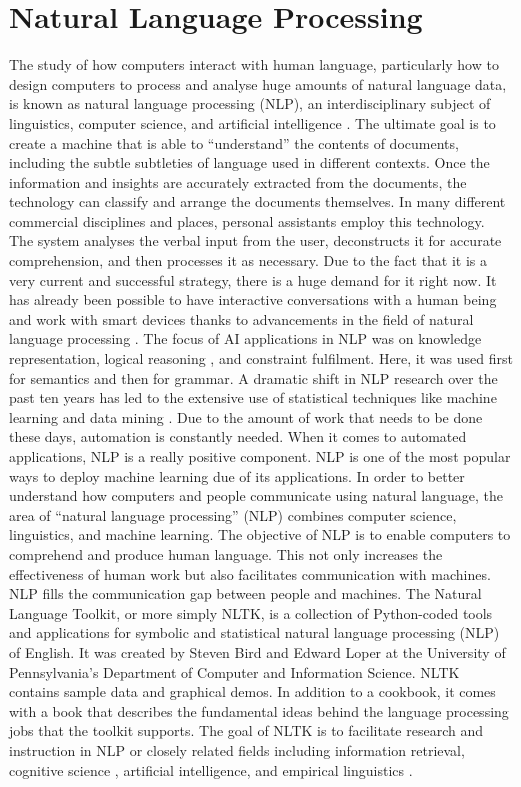 \documentclass[sn-basic]{sn-jnl}%
\theoremstyle{thmstyleone}%
\theoremstyle{thmstyletwo}%
\theoremstyle{thmstylethree}%
\begin{document}
\section{Natural Language Processing}
The study of how computers interact with human language, particularly how to design computers to process and analyse huge amounts of natural language data, is known as natural language processing (NLP), an interdisciplinary subject of linguistics, computer science, and artificial intelligence \cite{olsson2022estimating}. The ultimate goal is to create a machine that is able to “understand” the contents of documents, including the subtle subtleties of language used in different contexts. Once the information and insights are accurately extracted from the documents, the technology can classify and arrange the documents themselves. In many different commercial disciplines and places, personal assistants employ this technology. The system analyses the verbal input from the user, deconstructs it for accurate comprehension, and then processes it as necessary. Due to the fact that it is a very current and successful strategy, there is a huge demand for it right now. It has already been possible to have interactive conversations with a human being and work with smart devices thanks to advancements in the field of natural language processing \cite{wahab2021dna}. The focus of AI applications in NLP was on knowledge representation, logical reasoning \cite{houde2003neural}, and constraint fulfilment. Here, it was used first for semantics and then for grammar. A dramatic shift in NLP research over the past ten years has led to the extensive use of statistical techniques like machine learning \cite{ward2022machine} and data mining \cite{martinez2022nationwide}. Due to the amount of work that needs to be done these days, automation is constantly needed. When it comes to automated applications, NLP is a really positive component. NLP is one of the most popular ways to deploy machine learning due of its applications. In order to better understand how computers and people communicate using natural language, the area of “natural language processing” (NLP) combines computer science, linguistics, and machine learning. The objective of NLP is to enable computers to comprehend and produce human language. This not only increases the effectiveness of human work but also facilitates communication with machines. NLP fills the communication gap between people and machines. The Natural Language Toolkit, or more simply NLTK, is a collection of Python-coded tools and applications for symbolic and statistical natural language processing (NLP) of English. It was created by Steven Bird and Edward Loper at the University of Pennsylvania's Department of Computer and Information \cite{roth2022natural} Science. NLTK contains sample data and graphical demos. In addition to a cookbook, it comes with a book that describes the fundamental ideas behind the language processing jobs \cite{zhu2022distinct} that the toolkit supports. The goal of NLTK is to facilitate research and instruction in NLP or closely related fields including information retrieval, cognitive science \cite{lorden2022enhanced}, artificial intelligence, and empirical linguistics \cite{maiorani2022towards}. 
\end{document}
